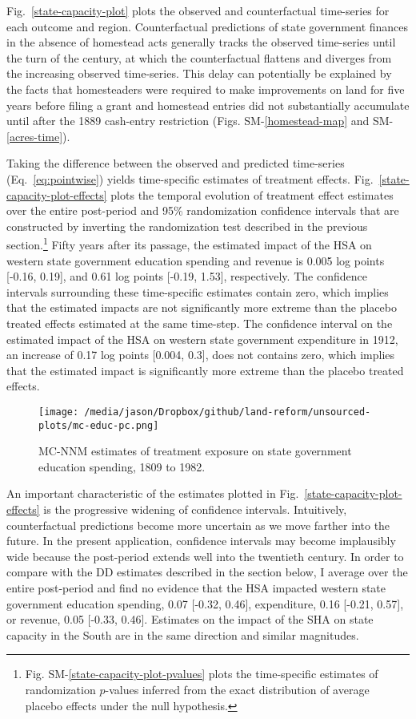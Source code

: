 \documentclass[hidelinks,12pt]{article}
\begin{document}
Fig.~\ref{state-capacity-plot} plots the observed and counterfactual time-series for each outcome and region. Counterfactual predictions of state government finances in the absence of homestead acts generally tracks the observed time-series until the turn of the century, at which the counterfactual flattens and diverges from the increasing observed time-series. This delay can potentially be explained by the facts that homesteaders were required to make improvements on land for five years before filing a grant and homestead entries did not substantially accumulate until after the 1889 cash-entry restriction (Figs. SM-\ref{homestead-map} and SM-\ref{acres-time}). 

Taking the difference between the observed and predicted time-series (Eq.~\ref{eq:pointwise}) yields time-specific estimates of treatment effects. Fig.~\ref{state-capacity-plot-effects} plots the temporal evolution of treatment effect estimates over the entire post-period and 95\% randomization confidence intervals that are constructed by inverting the randomization test described in the previous section.\footnote{Fig. SM-\ref{state-capacity-plot-pvalues} plots the time-specific estimates of randomization $p$-values inferred from the exact distribution of average placebo effects under the null hypothesis.} Fifty years after its passage, the estimated impact of the HSA on western state government education spending and revenue is 0.005 log points [-0.16, 0.19], and 0.61 log points [-0.19, 1.53], respectively. The confidence intervals surrounding these time-specific estimates contain zero, which implies that the estimated impacts are not significantly more extreme than the placebo treated effects estimated at the same time-step. The confidence interval on the estimated impact of the HSA on western state government expenditure in 1912, an increase of 0.17 log points [0.004, 0.3], does not contains zero, which implies that the estimated impact is significantly more extreme than the placebo treated effects. 

\begin{figure}[htbp]
	\centering
	\texttt{[image: /media/jason/Dropbox/github/land-reform/unsourced-plots/mc-educ-pc.png]}
	\caption{MC-NNM estimates of treatment exposure on state government education spending, 1809 to 1982.\label{mc-educ-pc}} 
\end{figure}

An important characteristic of the estimates plotted in Fig.~\ref{state-capacity-plot-effects} is the progressive widening of confidence intervals. Intuitively, counterfactual predictions become more uncertain as we move farther into the future. In the present application, confidence intervals may become implausibly wide because the post-period extends well into the twentieth century. In order to compare with the DD estimates described in the section below, I average over the entire post-period and find no evidence that the HSA impacted western state government education spending, 0.07 [-0.32, 0.46], expenditure, 0.16 [-0.21, 0.57], or revenue, 0.05 [-0.33, 0.46]. Estimates on the impact of the SHA on state capacity in the South are in the same direction and similar magnitudes. 
\end{document}
